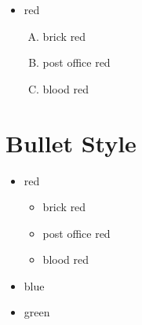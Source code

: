 \documentclass[12pt]{article}
\begin{document}
		\begin{itemize}
			\item red
			\begin{enumerate}[A.]
				\item brick red
				\item post office red
				\item blood red
			\end{enumerate}
		\end{itemize}
	
	\renewcommand{\labelitemi}{$\diamond$}
	\renewcommand{\labelitemii}{$\blacksquare$}
	\section{Bullet Style}
	
		\begin{itemize}
			\item red
			\begin{itemize}
				\item brick red
				\item post office red
				\item blood red
			\end{itemize}
			\item blue
			\item green
		\end{itemize}
		
		
\end{document}
